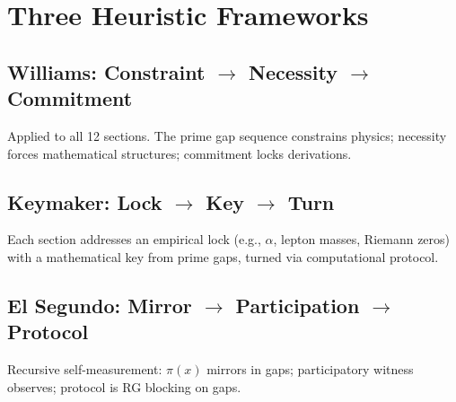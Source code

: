 \chapter{Three Heuristic Frameworks}
\label{app:heuristics}

\section{Williams: Constraint $\to$ Necessity $\to$ Commitment}
Applied to all 12 sections. The prime gap sequence constrains physics; necessity forces mathematical structures; commitment locks derivations.

\section{Keymaker: Lock $\to$ Key $\to$ Turn}
Each section addresses an empirical lock (e.g., $\alpha$, lepton masses, Riemann zeros) with a mathematical key from prime gaps, turned via computational protocol.

\section{El Segundo: Mirror $\to$ Participation $\to$ Protocol}
Recursive self-measurement: $\pi(x)$ mirrors in gaps; participatory witness observes; protocol is RG blocking on gaps.
